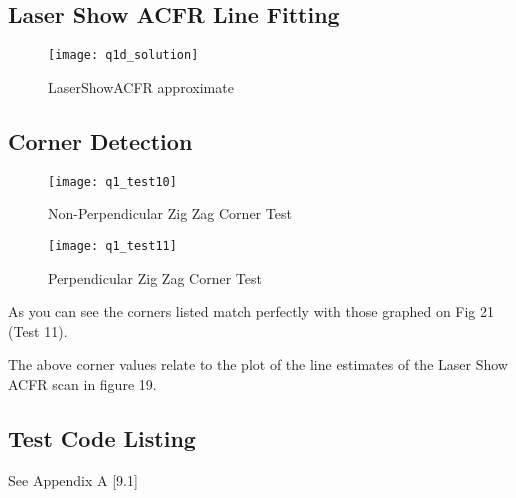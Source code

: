 	\pagebreak
	\subsection{Laser Show ACFR Line Fitting}	%
			
			\linebreak
			\begin{figure}[position = here]
				\begin{centering}
					\texttt{[image: q1d\_solution]}\\
					\caption[\textit{RPYAxes}]{LaserShowACFR approximate}
				\end{centering}
			\end{figure}
			\newline	
			
	\pagebreak
	\subsection{Corner Detection}	%
		
		\linebreak
		
		\begin{figure}[position = here]
			\begin{centering}
				\texttt{[image: q1\_test10]}\\
				\caption[\textit{RPYAxes}]{Non-Perpendicular Zig Zag Corner Test}
			\end{centering}
		\end{figure}
		\newline
		
		\begin{figure}[position = here]
			\begin{centering}
				\texttt{[image: q1\_test11]}\\
				\caption[\textit{RPYAxes}]{Perpendicular Zig Zag Corner Test}
			\end{centering}
		\end{figure}
		\newline		
		\pagebreak
		
		\linebreak
		
		As you can see the corners listed match perfectly with those graphed on Fig 21 (Test 11).
		
		
		\linebreak
		The above corner values relate to the plot of the line estimates of the Laser Show ACFR scan in figure 19.
		
		\subsection*{Test Code Listing}
			See Appendix A [9.1]